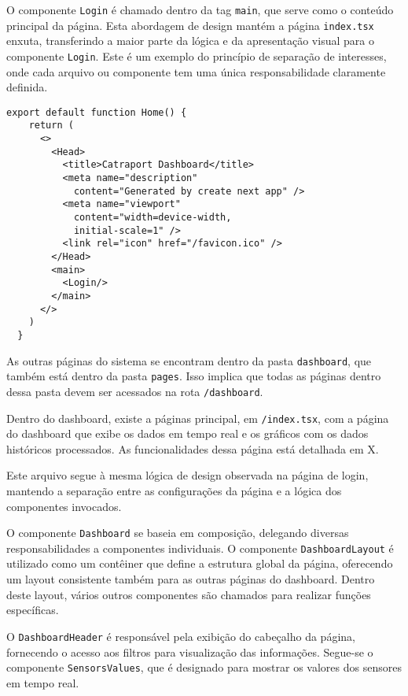 O componente \texttt{Login} é chamado dentro da tag \texttt{main}, que serve como o conteúdo principal da página. Esta abordagem de design mantém a página \texttt{index.tsx} enxuta, transferindo a maior parte da lógica e da apresentação visual para o componente \texttt{Login}. Este é um exemplo do princípio de separação de interesses, onde cada arquivo ou componente tem uma única responsabilidade claramente definida.

\begin{verbatim}
export default function Home() {
    return (
      <>
        <Head>
          <title>Catraport Dashboard</title>
          <meta name="description" 
            content="Generated by create next app" />
          <meta name="viewport" 
            content="width=device-width,
            initial-scale=1" />
          <link rel="icon" href="/favicon.ico" />
        </Head>
        <main>
          <Login/>
        </main>
      </>
    )
  }
\end{verbatim}

As outras páginas do sistema se encontram dentro da pasta \texttt{dashboard}, que também está dentro da pasta \texttt{pages}. Isso implica que todas as páginas dentro dessa pasta devem ser acessados na rota \texttt{/dashboard}.

Dentro do dashboard, existe a páginas principal, em \texttt{/index.tsx}, com a página do dashboard que exibe os dados em tempo real e os gráficos com os dados históricos processados. As funcionalidades dessa página está detalhada em X. %

Este arquivo segue à mesma lógica de design observada na página de login, mantendo a separação entre as configurações da página e a lógica dos componentes invocados.

O componente \texttt{Dashboard} se baseia em composição, delegando diversas responsabilidades a componentes individuais. O componente \texttt{DashboardLayout} é utilizado como um contêiner que define a estrutura global da página, oferecendo um layout consistente também para as outras páginas do dashboard. Dentro deste layout, vários outros componentes são chamados para realizar funções específicas.

O \texttt{DashboardHeader} é responsável pela exibição do cabeçalho da página, fornecendo o acesso aos filtros para visualização das informações. Segue-se o componente \texttt{SensorsValues}, que é designado para mostrar os valores dos sensores em tempo real.

